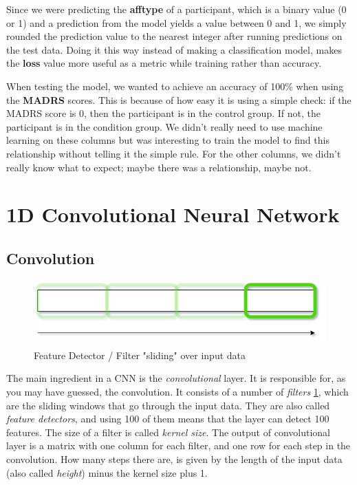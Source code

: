 Since we were predicting the \textbf{afftype} of a participant, which is a binary value (0 or 1) and a prediction from the model yields a value between 0 and 1, 
we simply rounded the prediction value to the nearest integer after running predictions on the test data. Doing it this way instead of making a classification model, 
makes the \textbf{loss} value more useful as a metric while training rather than accuracy. 

When testing the model, we wanted to achieve an accuracy of 100\% when using the \textbf{MADRS} scores. This is because of how easy it is using a simple check: 
if the MADRS score is 0, then the participant is in the control group. If not, the participant is in the condition group. We didn't really need to use machine learning 
on these columns but was interesting to train the model to find this relationship without telling it the simple rule. For the other columns, we didn't really know what to expect; 
maybe there was a relationship, maybe not.

\section{1D Convolutional Neural Network}

\subsection{Convolution}
\begin{figure}
    \includegraphics[height=2.5cm]{img/feature_detector.png}
    \caption{Feature Detector / Filter "sliding" over input data}
    \label{figure:feature_detector}
\end{figure}

The main ingredient in a CNN is the \textit{convolutional} layer. It is responsible for, as you may have guessed, the convolution.
It consists of a number of \textit{filters} \ref{figure:feature_detector}, which are the sliding windows that go through the input data. 
They are also called \textit{feature detectors}, and using 100 of them means that the layer can detect 100 features. 
The size of a filter is called \textit{kernel size}. The output of convolutional layer is a matrix with one column for each filter, and one row for each step
in the convolution. How many steps there are, is given by the length of the input data (also called \textit{height}) minus the kernel size plus 1.



